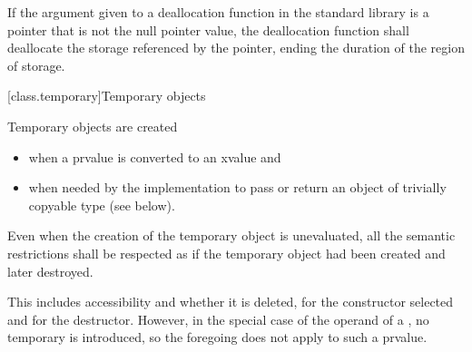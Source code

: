 \pnum
If the argument given to a deallocation function in the standard library
is a pointer that is not the null pointer value, the
deallocation function shall deallocate the storage referenced by the
pointer, ending the duration of the region of storage.

[class.temporary]{Temporary objects}

\pnum
{}%
%
%
%
%
Temporary objects are created
\begin{itemize}
\item
when a prvalue is converted to an xvalue and
\item
when needed by the implementation to pass or return an object of trivially copyable type (see below).
\end{itemize}
Even when the creation of the temporary object is
unevaluated,
all the semantic restrictions shall be respected as if the temporary object
had been created and later destroyed.
\begin{note}
This includes accessibility and whether it is deleted,
for the constructor selected and for the destructor. However, in the special
case of the operand of a
, no temporary is introduced,
so the foregoing does not apply to such a prvalue.
\end{note}

